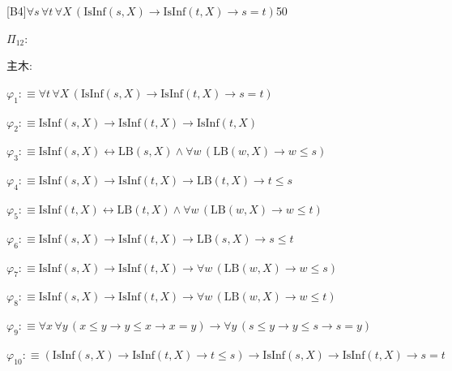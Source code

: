 \begin{fullproof}{[B4]}{$\forall s\,\forall t\,\forall X\,(\mathrm{IsInf}(s,X) \to \mathrm{IsInf}(t,X) \to s = t)$}{50}
\begin{ptree}
\end{ptree}
\noindent$\Pi_{12}$:
\begin{ptree}
\noLine
{}
\noLine
{}
\end{ptree}
\noindent 主木:
\begin{ptree}
\noLine
{}
\noLine
{}
\end{ptree}
\begin{abbrevlist}
\item $\varphi_{1} :\equiv \forall t\,\forall X\,(\mathrm{IsInf}(s,X) \to \mathrm{IsInf}(t,X) \to s = t)$
\item $\varphi_{2} :\equiv \mathrm{IsInf}(s,X) \to \mathrm{IsInf}(t,X) \to \mathrm{IsInf}(t,X)$
\item $\varphi_{3} :\equiv \mathrm{IsInf}(s,X) \leftrightarrow \mathrm{LB}(s,X) \land \forall w\,(\mathrm{LB}(w,X) \to w \leq s)$
\item $\varphi_{4} :\equiv \mathrm{IsInf}(s,X) \to \mathrm{IsInf}(t,X) \to \mathrm{LB}(t,X) \to t \leq s$
\item $\varphi_{5} :\equiv \mathrm{IsInf}(t,X) \leftrightarrow \mathrm{LB}(t,X) \land \forall w\,(\mathrm{LB}(w,X) \to w \leq t)$
\item $\varphi_{6} :\equiv \mathrm{IsInf}(s,X) \to \mathrm{IsInf}(t,X) \to \mathrm{LB}(s,X) \to s \leq t$
\item $\varphi_{7} :\equiv \mathrm{IsInf}(s,X) \to \mathrm{IsInf}(t,X) \to \forall w\,(\mathrm{LB}(w,X) \to w \leq s)$
\item $\varphi_{8} :\equiv \mathrm{IsInf}(s,X) \to \mathrm{IsInf}(t,X) \to \forall w\,(\mathrm{LB}(w,X) \to w \leq t)$
\item $\varphi_{9} :\equiv \forall x\,\forall y\,(x \leq y \to y \leq x \to x = y) \to \forall y\,(s \leq y \to y \leq s \to s = y)$
\item $\varphi_{10} :\equiv (\mathrm{IsInf}(s,X) \to \mathrm{IsInf}(t,X) \to t \leq s) \to \mathrm{IsInf}(s,X) \to \mathrm{IsInf}(t,X) \to s = t$

\end{abbrevlist}
\end{fullproof}
